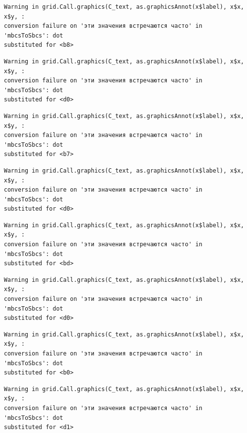 \documentclass[
  letterpaper,
]{scrbook}
\theoremstyle{definition}
\theoremstyle{remark}
\begin{document}
\begin{verbatim}
Warning in grid.Call.graphics(C_text, as.graphicsAnnot(x$label), x$x, x$y, :
conversion failure on 'эти значения встречаются часто' in 'mbcsToSbcs': dot
substituted for <b8>
\end{verbatim}

\begin{verbatim}
Warning in grid.Call.graphics(C_text, as.graphicsAnnot(x$label), x$x, x$y, :
conversion failure on 'эти значения встречаются часто' in 'mbcsToSbcs': dot
substituted for <d0>
\end{verbatim}

\begin{verbatim}
Warning in grid.Call.graphics(C_text, as.graphicsAnnot(x$label), x$x, x$y, :
conversion failure on 'эти значения встречаются часто' in 'mbcsToSbcs': dot
substituted for <b7>
\end{verbatim}

\begin{verbatim}
Warning in grid.Call.graphics(C_text, as.graphicsAnnot(x$label), x$x, x$y, :
conversion failure on 'эти значения встречаются часто' in 'mbcsToSbcs': dot
substituted for <d0>
\end{verbatim}

\begin{verbatim}
Warning in grid.Call.graphics(C_text, as.graphicsAnnot(x$label), x$x, x$y, :
conversion failure on 'эти значения встречаются часто' in 'mbcsToSbcs': dot
substituted for <bd>
\end{verbatim}

\begin{verbatim}
Warning in grid.Call.graphics(C_text, as.graphicsAnnot(x$label), x$x, x$y, :
conversion failure on 'эти значения встречаются часто' in 'mbcsToSbcs': dot
substituted for <d0>
\end{verbatim}

\begin{verbatim}
Warning in grid.Call.graphics(C_text, as.graphicsAnnot(x$label), x$x, x$y, :
conversion failure on 'эти значения встречаются часто' in 'mbcsToSbcs': dot
substituted for <b0>
\end{verbatim}

\begin{verbatim}
Warning in grid.Call.graphics(C_text, as.graphicsAnnot(x$label), x$x, x$y, :
conversion failure on 'эти значения встречаются часто' in 'mbcsToSbcs': dot
substituted for <d1>
\end{verbatim}
\end{document}
